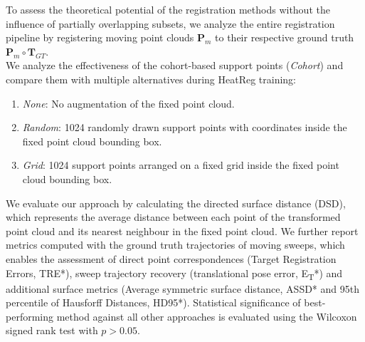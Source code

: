 To assess the theoretical potential of the registration methods without the influence of partially overlapping subsets, we analyze the entire registration pipeline by registering moving point clouds $\mathbf{P}_{m}$ to their respective ground truth $\mathbf{P}_{m}\circ \mathbf{T}_{GT}$. \\

 We analyze the effectiveness of the cohort-based support points (\textit{Cohort}) and compare them with multiple alternatives during HeatReg training:
\begin{enumerate}
    \item \textit{None}: No augmentation of the fixed point cloud.
    \item \textit{Random}: 1024 randomly drawn support points with coordinates inside the fixed point cloud bounding box.
    \item \textit{Grid}: 1024 support points arranged on a fixed grid inside the fixed point cloud bounding box.
\end{enumerate}

 We evaluate our approach by calculating the directed surface distance (DSD), which represents the average distance  between each point of the transformed point cloud and its nearest neighbour in the fixed point cloud. We further report metrics computed with the ground truth trajectories of moving sweeps, which enables the assessment of direct point correspondences (Target Registration Errors, TRE*), sweep trajectory recovery (translational pose error, E\textsubscript{T}*) and additional surface metrics (Average symmetric surface distance, ASSD* and 95th percentile of Hausforff Distances, HD95*). Statistical significance of best-performing method against all other approaches is evaluated using the Wilcoxon signed rank test with $p>0.05$.


